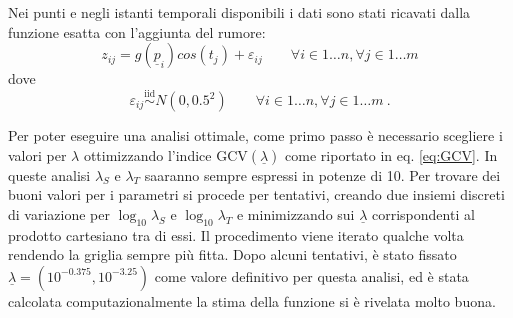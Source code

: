 \documentclass[a4paper,11pt,twoside,openright]{book}							%
\begin{document}
Nei punti e negli istanti temporali disponibili i dati sono stati ricavati dalla funzione esatta con l'aggiunta del rumore:
$$
z_{ij}=g(\underline p_{i})cos(t_j) + \varepsilon_{ij} \qquad \forall i \in 1\ldots n, \forall j \in 1\ldots m
$$
dove
$$
\varepsilon_{ij}\stackrel{\mathrm{iid}}{\sim}N(0,0.5^2) \qquad \forall i \in 1\ldots n, \forall j \in 1\ldots m \ .
$$

Per poter eseguire una analisi ottimale, come primo passo è necessario scegliere i valori per $\lambda$ ottimizzando l'indice $\mathrm{GCV}(\underline \lambda)$ come riportato in eq. \ref{eq:GCV}. In queste analisi $\lambda_S$ e $\lambda_T$ saaranno sempre espressi in potenze di 10. Per trovare dei buoni valori per i parametri si procede per tentativi, creando due insiemi discreti di variazione per $\log_{10}\lambda_S$ e $\log_{10}\lambda_T$ e minimizzando sui $\underline \lambda$ corrispondenti al prodotto cartesiano tra di essi. Il procedimento viene iterato qualche volta rendendo la griglia sempre più fitta. Dopo alcuni tentativi, è stato fissato $\underline \lambda = (10^{-0.375}, 10^{-3.25})$ come valore definitivo per questa analisi, ed è stata calcolata computazionalmente la stima della funzione si è rivelata molto buona.
\end{document}
